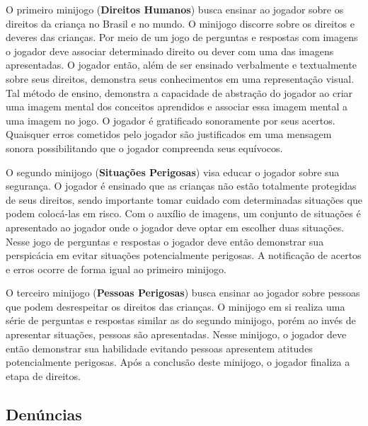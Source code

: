 \begin{figure}
  \vspace{-1.0cm}
\end{figure}

O primeiro minijogo (\textbf{Direitos Humanos}) busca ensinar ao jogador sobre os direitos da criança no Brasil e no mundo. O minijogo discorre sobre os direitos e deveres das crianças. Por meio de um jogo de perguntas e respostas com imagens o jogador deve associar determinado direito ou dever com uma das imagens apresentadas. O jogador então, além de ser ensinado verbalmente e textualmente sobre seus direitos, demonstra seus conhecimentos em uma representação visual. Tal método de ensino, demonstra a capacidade de abstração do jogador ao criar uma imagem mental dos conceitos aprendidos e associar essa imagem mental a uma imagem no jogo. O jogador é gratificado sonoramente por seus acertos. Quaisquer erros cometidos pelo jogador são justificados em uma mensagem sonora possibilitando que o jogador compreenda seus equívocos. 

O segundo minijogo (\textbf{Situações Perigosas}) visa educar o jogador sobre sua segurança. O jogador é ensinado que as crianças não estão totalmente protegidas de seus direitos, sendo importante tomar cuidado com determinadas situações que podem colocá-las em risco. %
Com o auxílio de imagens, um conjunto de situações é apresentado ao jogador onde o jogador deve optar em escolher duas situações. Nesse jogo de perguntas e respostas o jogador deve então demonstrar sua perspicácia em evitar situações potencialmente perigosas. A notificação de acertos e erros ocorre de forma igual ao primeiro minijogo.

O terceiro minijogo (\textbf{Pessoas Perigosas}) busca ensinar ao jogador sobre pessoas que podem desrespeitar os direitos das crianças. O minijogo em si realiza uma série de perguntas e respostas similar as do segundo minijogo, porém ao invés de apresentar situações, pessoas são apresentadas. Nesse minijogo, o jogador deve então demonstrar sua habilidade evitando pessoas apresentem atitudes potencialmente perigosas. Após a conclusão deste minijogo, o jogador finaliza a etapa de direitos. 


\subsection{Denúncias}\label{subsec:3}

